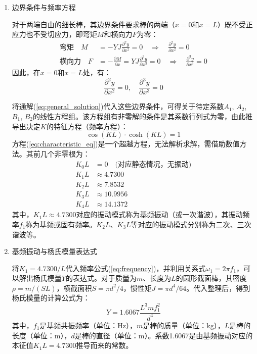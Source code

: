 \documentclass[11pt]{article}
\begin{document}
\begin{enumerate}
\item 边界条件与频率方程\par
对于两端自由的细长棒，其边界条件要求棒的两端（$x=0$和$x=L$）既不受正应力也不受切应力，即弯矩$M$和横向力$F$为零：
\begin{align}
\text{弯矩} \quad M &= -YJ \frac{\partial^2 y}{\partial x^2} = 0 \quad \Rightarrow \quad \frac{\partial^2 y}{\partial x^2} = 0 \\
\text{横向力} \quad F &= -\frac{\partial M}{\partial x} = YJ \frac{\partial^3 y}{\partial x^3} = 0 \quad \Rightarrow \quad \frac{\partial^3 y}{\partial x^3} = 0
\end{align}
因此，在$x=0$和$x=L$处，有：
\begin{equation}
\frac{\partial^2 y}{\partial x^2} = 0, \quad \frac{\partial^3 y}{\partial x^3} = 0
\end{equation}

将通解(\ref{eq:general_solution})代入这些边界条件，可得关于待定系数$A_1$, $A_2$, $B_1$, $B_2$的线性方程组。该方程组有非零解的条件是其系数行列式为零，由此推导出决定$K$的特征方程（频率方程）：
\begin{equation}
\cos(KL) \cdot \cosh(KL) = 1
\label{eq:characteristic_eq}
\end{equation}
方程(\ref{eq:characteristic_eq})是一个超越方程，无法解析求解，需借助数值方法。其前几个非零根为：
\begin{align*}
K_0 L &= 0 \quad \text{(对应静态情况，无振动)} \\
K_1 L &\approx 4.7300 \\
K_2 L &\approx 7.8532 \\
K_3 L &\approx 10.9956 \\
K_4 L &\approx 14.1372
\end{align*}
其中，$K_1 L \approx 4.7300$对应的振动模式称为基频振动（或一次谐波），其振动频率$f_1$称为基频或固有频率。$K_2 L$、$K_3 L$等对应的振动模式分别称为二次、三次谐波等。

\item 基频振动与杨氏模量表达式\par
将$K_1 = 4.7300 / L$代入频率公式(\ref{eq:frequency})，并利用关系式$\omega_1 = 2\pi f_1$，可以解出杨氏模量$Y$的表达式。对于质量为$m$、长度为$L$的圆形截面棒，其密度$\rho = m / (S L)$，横截面积$S = \pi d^2 / 4$，惯性矩$J = \pi d^4 / 64$。代入整理后，得到杨氏模量的计算公式为：
\begin{equation}
Y = 1.6067 \frac{L^3 m f_1^2}{d^4}
\label{eq:young_modulus_basic}
\end{equation}
其中，$f_1$是基频共振频率（单位：Hz），$m$是棒的质量（单位：kg），$L$是棒的长度（单位：m），$d$是棒的直径（单位：m）。系数1.6067是由基频振动对应的本征值$K_1 L = 4.7300$推导而来的常数。


\end{enumerate}
\end{document}
